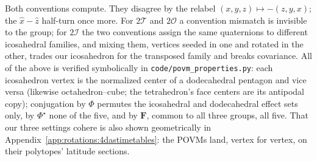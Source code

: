 \documentclass[11pt, oneside, openany]{scrbook}
\newcommand{\Tgroup}{\mathcal{T}}  %
\newcommand{\Ogroup}{\mathcal{O}}  %
\newcommand{\Igroup}{\mathcal{I}}  %
\newcommand{\TwoT}{2\Tgroup}
\newcommand{\TwoO}{2\Ogroup}
\newcommand{\TwoI}{2\Igroup}
\begin{document}
Both conventions compute. They disagree by the relabel $(x, y, z) \mapsto -(z, y, x)$; the $\hat x - \hat z$ half-turn once more. For $\TwoT$ and $\TwoO$ a convention mismatch is invisible to the group; for $\TwoI$ the two conventions assign the same quaternions to different icosahedral families, and mixing them, vertices seeded in one and rotated in the other, trades our icosahedron for the transposed family and breaks covariance. All of the above is verified symbolically in \texttt{code/povm\_properties.py}: each icosahedron vertex is the normalized center of a dodecahedral pentagon and vice versa (likewise octahedron--cube; the tetrahedron's face centers are its antipodal copy); conjugation by $\Phi$ permutes the icosahedral and dodecahedral effect sets only, by $\Phi^\star$ none of the five, and by $\mathbf{F}$, common to all three groups, all five. That our three settings cohere is also shown geometrically in Appendix~\ref{app:rotations:4dastimetables}: the POVMs land, vertex for vertex, on their polytopes' latitude sections.
\end{document}
